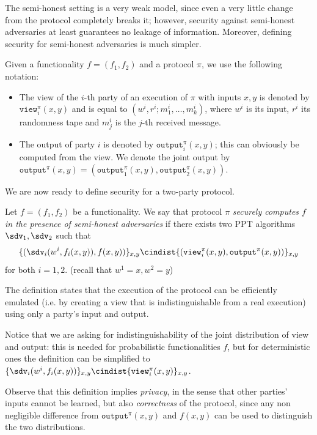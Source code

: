 The semi-honest setting is a very weak model, since even a very little change from the protocol completely breaks it; however, security against semi-honest adversaries at least guarantees no leakage of information. Moreover, defining security for semi-honest adversaries is much simpler.

Given a functionality $f=(f_1,f_2)$ and a protocol $\pi$, we use the following notation:
\begin{itemize}
    \item The view of the $i$-th party of an execution of $\pi$ with inputs $x,y$ is denoted by $\texttt{view}_i^\pi(x,y)$ and is equal to $(w^i,r^i;m_1^i,\dots,m_k^i)$, where $w^i$ is its input, $r^i$ its randomness tape and $m_j^i$ is the $j$-th received message.
    \item The output of party $i$ is denoted by $\texttt{output}_i^\pi(x,y)$; this can obviously be computed from the view. We denote the joint output by $\texttt{output}^\pi(x,y)=(\texttt{output}_1^\pi(x,y),\texttt{output}_2^\pi(x,y))$.
\end{itemize}

We are now ready to define security for a two-party protocol.
\begin{definition}
    Let $f=(f_1,f_2)$ be a functionality. We say that protocol $\pi$ \emph{securely computes $f$ in the presence of semi-honest adversaries} if there exists two PPT algorithms $\sdv_1,\sdv_2$ such that
    $$ \{ (\sdv_i(w^i,f_i(x,y)), f(x,y) ) \}_{x,y} \cindist \{ (\texttt{view}_i^\pi(x,y), \texttt{output}^\pi(x,y)) \}_{x,y} $$
    for both $i=1,2$. (recall that $w^1=x,w^2=y$)
\end{definition}

The definition states that the execution of the protocol can be efficiently emulated (i.e. by creating a view that is indistinguishable from a real execution) using only a party's input and output.

Notice that we are asking for indistinguishability of the joint distribution of view and output: this is needed for probabilistic functionalities $f$, but for deterministic ones the definition can be simplified to $ \{ \sdv_i(w^i,f_i(x,y)) \}_{x,y} \cindist \{ \texttt{view}_i^\pi(x,y) \}_{x,y} $.

Observe that this definition implies \emph{privacy}, in the sense that other parties' inputs cannot be learned, but also \emph{correctness} of the protocol, since any non negligible difference from $\texttt{output}^\pi(x,y)$ and $f(x,y)$ can be used to distinguish the two distributions.


